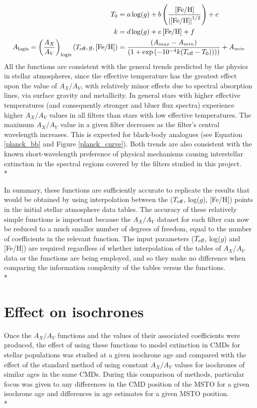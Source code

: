 \documentclass[12pt, a4paper]{report}
\begin{document}
\begin{align}
T_{\textnormal{0}} &= a\log(g) + b\left(\frac{\left[\textnormal{Fe/H}\right]}{\left|\left[\textnormal{Fe/H}\right]\right|^{1/2}}\right) + c \label{T0_eq}\\
k &= d\log(g) + e\left[\textnormal{Fe/H}\right] + f \label{decay_const_eq}\\
A_{\textnormal{logis}} = \left(\frac{A_{X}}{A_{V}}\right)_{\textnormal{logis}}(T_{\textnormal{eff}},g,\left[\textnormal{Fe/H}\right]) &= \frac{(A_{max}-A_{min})}{( 1 + \exp{(-10^{-4} k(T_{\textnormal{eff}}-T_{\textnormal{0}})) ) )}} + A_{min} \label{A_logis_UV}
\end{align}
All the functions are consistent with the general trends predicted by the physics in stellar atmospheres, since the effective temperature has the greatest effect upon the value of $A_{X}/A_{V}$, with relatively minor effects due to spectral absorption lines, via surface gravity and metallicity. In general stars with higher effective temperatures (and consequently stronger and bluer flux spectra) experience higher $A_{X}/A_{V}$ values in all filters than stars with low effective temperatures. The maximum $A_{X}/A_{V}$ value in a given filter decreases as the filter's central wavelength increases. This is expected for black-body analogues (see Equation \ref{planck_bb} and Figure \ref{planck_curve}). Both trends are also consistent with the known short-wavelength preference of physical mechanisms causing interstellar extinction in the spectral regions covered by the filters studied in this project.\\*

In summary, these functions are sufficiently accurate to replicate the results that would be obtained by using interpolation between the ($T_{\textnormal{eff}}$, log($g$), [Fe/H]) points in the initial stellar atmosphere data tables. The accuracy of these relatively simple functions is important because the $A_{X}/A_{V}$ dataset for each filter can now be reduced to a much smaller number of degrees of freedom, equal to the number of coefficients in the relevant function. The input parameters ($T_{\textnormal{eff}}$, log($g$) and [Fe/H]) are required regardless of whether interpolation of the tables of $A_{X}/A_{V}$ data or the functions are being employed, and so they make no difference when comparing the information complexity of the tables versus the functions.\\*


\section{Effect on isochrones} \label{result_CMDs}
Once the $A_{X}/A_{V}$ functions and the values of their associated coefficients were produced, the effect of using these functions to model extinction in CMDs for stellar populations was studied at a given isochrone age and compared with the effect of the standard method of using constant $A_{X}/A_{V}$ values for isochrones of similar ages in the same CMDs. During this comparison of methods, particular focus was given to any differences in the CMD position of the MSTO for a given isochrone age and differences in age estimates for a given MSTO position.  \\*
\end{document}
